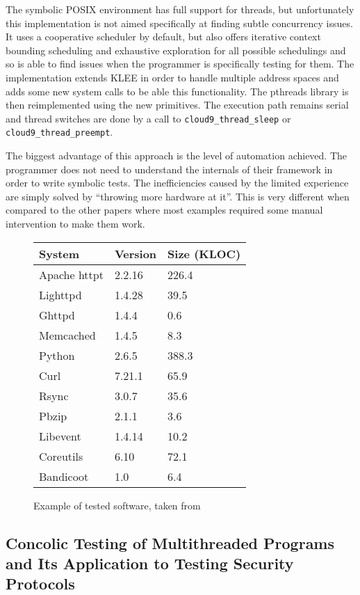 \documentclass[10pt]{llncs}
\begin{document}
The symbolic POSIX environment has full support for threads, but unfortunately this implementation is not aimed specifically at finding subtle concurrency issues. It uses a cooperative scheduler by default, but also offers iterative context bounding scheduling \cite{Musuvathi} and exhaustive exploration for all possible schedulings and so is able to find issues when the programmer is specifically testing for them. The implementation extends KLEE in order to handle multiple address spaces and adds some new system calls to be able this functionality. The pthreads library is then reimplemented using the new primitives. The execution path remains serial and thread switches are done by a call to \texttt{cloud9\_thread\_sleep} or \texttt{cloud9\_thread\_preempt}.

The biggest advantage of this approach is the level of automation achieved. The programmer does not need to understand the internals of their framework in order to write symbolic tests. The inefficiencies caused by the limited experience are simply solved by ``throwing more hardware at it''. This is very different when compared to the other papers where most examples required some manual intervention to make them work.

\begin{figure}
	\centering
	
	\begin{tabular}{l l l}
		System & Version & Size (KLOC) \\
		\hline
		Apache httpt & 2.2.16 & 226.4 \\
		Lighttpd & 1.4.28 & 39.5 \\
		Ghttpd & 1.4.4 & 0.6 \\
		Memcached & 1.4.5 & 8.3 \\
		Python & 2.6.5 & 388.3 \\
		Curl & 7.21.1 & 65.9 \\
		Rsync & 3.0.7 & 35.6 \\
		Pbzip & 2.1.1 & 3.6 \\
		Libevent & 1.4.14 & 10.2 \\
		Coreutils & 6.10 & 72.1 \\
		Bandicoot & 1.0 & 6.4
	\end{tabular}
	
	\caption{Example of tested software, taken from \cite{base3}}
	\label{example:3}
\end{figure}

\subsection{Concolic Testing of Multithreaded Programs and	Its Application to Testing Security Protocols \cite{base4}}
\end{document}
